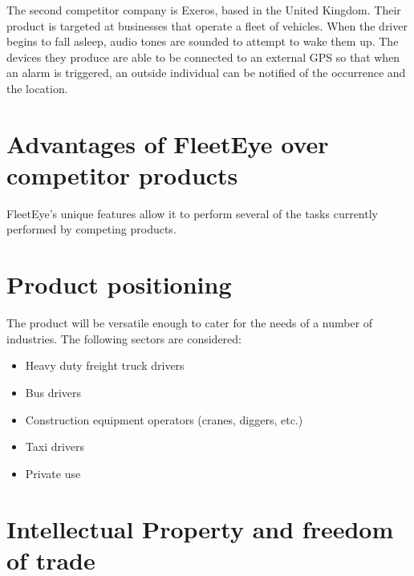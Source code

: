 The second competitor company is Exeros, based in the United Kingdom. Their product is targeted at businesses that operate a fleet of vehicles. When the driver begins to fall asleep, audio tones are sounded to attempt to wake them up. The devices they produce are able to be connected to an external GPS so that when an alarm is triggered, an outside individual can be notified of the occurrence and the location.



\section{Advantages of FleetEye over competitor products} 
FleetEye’s unique features allow it to perform several of the tasks currently performed by competing products.

\section{Product positioning}
The product will be versatile enough to cater for the needs of a number of industries. The following sectors are considered:
\begin{itemize}
\item Heavy duty freight truck drivers
\item Bus drivers
\item Construction equipment operators (cranes, diggers, etc.)
\item Taxi drivers
\item Private use
\end{itemize}

\section{Intellectual Property and freedom of trade}


